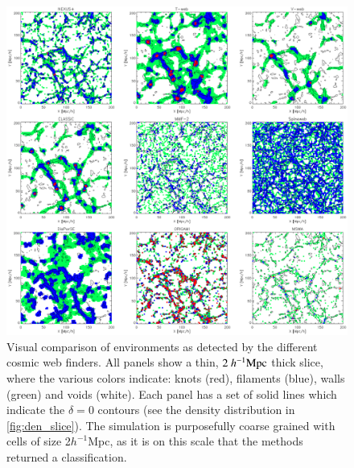 \begin{figure}
\begin{minipage}[t]{.99\linewidth}

 \includegraphics[width=\textwidth]{Chapter3b/FIGS/fig1v4a.eps}
 \vspace{-.4cm}
 \end{minipage}\hfill

 \caption{Visual comparison of environments as detected by the different cosmic web finders. All panels show a thin, $2~h^{-1}\rm Mpc$ thick slice, where the various colors indicate: knots (red), filaments (blue), walls (green) and voids (white). Each panel has a set of solid lines which indicate the $\delta=0$ contours (see the density distribution in \autoref{fig:den_slice}). The simulation is purposefully coarse grained with cells of size 2$h^{-1}$Mpc, as it is on this scale that the methods returned a classification.}
 \label{fig:env_slice_a}
\end{figure}

